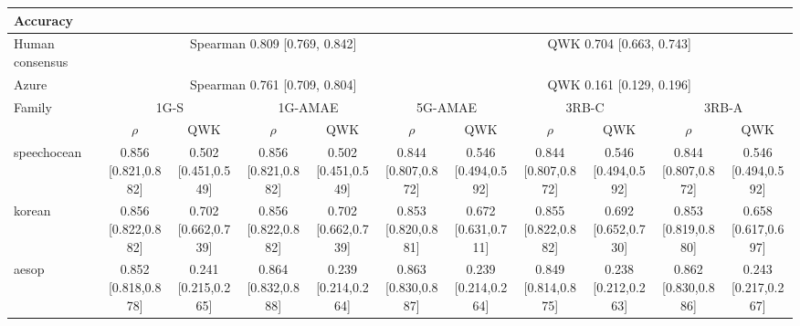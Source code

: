 \documentclass[10pt]{article}
\begin{document}
\begin{landscape}
\begin{longtable}{@{}l*{10}{c}@{}}
\multicolumn{11}{l}{\textbf{Accuracy}}\\*
\toprule
Human consensus & \multicolumn{5}{c}{Spearman 0.809 [0.769, 0.842]} & \multicolumn{5}{c}{QWK 0.704 [0.663, 0.743]}\\
Azure & \multicolumn{5}{c}{Spearman 0.761 [0.709, 0.804]} & \multicolumn{5}{c}{QWK 0.161 [0.129, 0.196]}\\
\midrule
Family & \multicolumn{2}{c}{1G-S} & \multicolumn{2}{c}{1G-AMAE} & \multicolumn{2}{c}{5G-AMAE} & \multicolumn{2}{c}{3RB-C} & \multicolumn{2}{c}{3RB-A}\\
 & $\rho$ & QWK & $\rho$ & QWK & $\rho$ & QWK & $\rho$ & QWK & $\rho$ & QWK\\
\midrule
speechocean & \shortstack{0.856\\{}[0.821,0.882]} & \shortstack{0.502\\{}[0.451,0.549]} & \shortstack{0.856\\{}[0.821,0.882]} & \shortstack{0.502\\{}[0.451,0.549]} & \shortstack{0.844\\{}[0.807,0.872]} & \shortstack{0.546\\{}[0.494,0.592]} & \shortstack{0.844\\{}[0.807,0.872]} & \shortstack{0.546\\{}[0.494,0.592]} & \shortstack{0.844\\{}[0.807,0.872]} & \shortstack{0.546\\{}[0.494,0.592]}\\
korean & \shortstack{0.856\\{}[0.822,0.882]} & \shortstack{0.702\\{}[0.662,0.739]} & \shortstack{0.856\\{}[0.822,0.882]} & \shortstack{0.702\\{}[0.662,0.739]} & \shortstack{0.853\\{}[0.820,0.881]} & \shortstack{0.672\\{}[0.631,0.711]} & \shortstack{0.855\\{}[0.822,0.882]} & \shortstack{0.692\\{}[0.652,0.730]} & \shortstack{0.853\\{}[0.819,0.880]} & \shortstack{0.658\\{}[0.617,0.697]}\\
aesop & \shortstack{0.852\\{}[0.818,0.878]} & \shortstack{0.241\\{}[0.215,0.265]} & \shortstack{0.864\\{}[0.832,0.888]} & \shortstack{0.239\\{}[0.214,0.264]} & \shortstack{0.863\\{}[0.830,0.887]} & \shortstack{0.239\\{}[0.214,0.264]} & \shortstack{0.849\\{}[0.814,0.875]} & \shortstack{0.238\\{}[0.212,0.263]} & \shortstack{0.862\\{}[0.830,0.886]} & \shortstack{0.243\\{}[0.217,0.267]}\\

\end{longtable}
\end{landscape}
\end{document}
